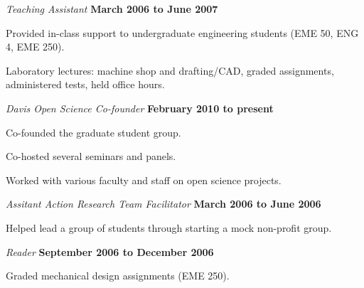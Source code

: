 \documentclass[10pt]{article}
\newenvironment{outerlist}[1][\enskip\textbullet]%
        {\begin{itemize}[#1]}{\end{itemize}%
         \vspace{-.6\baselineskip}}
\newenvironment{innerlist}[1][\enskip\textbullet]%
        {\begin{compactitem}[#1]}{\end{compactitem}}
\newcommand{\blankline}{\quad\pagebreak[2]}
\begin{document}
\begin{outerlist}
\item[] \textit{Teaching Assistant}%
        \hfill \textbf{March 2006 to June 2007}
\begin{innerlist}
  \item Provided in-class support to undergraduate engineering students (EME 50, ENG 4, EME 250).
  \item Laboratory lectures: machine shop and drafting/CAD, graded assignments, administered tests, held office hours.
\end{innerlist}

\item[] \textit{Davis Open Science Co-founder}%
        \hfill \textbf{February 2010 to present}
\begin{innerlist}
  \item Co-founded the graduate student group.
  \item Co-hosted several seminars and panels.
  \item Worked with various faculty and staff on open science projects.
\end{innerlist}

\item[] \textit{Assitant Action Research Team Facilitator}%
        \hfill \textbf{March 2006 to June 2006}
\begin{innerlist}
\item Helped lead a group of students through starting a mock non-profit group.
\end{innerlist}

\item[] \textit{Reader}%
        \hfill \textbf{September 2006 to December 2006}
\begin{innerlist}
\item Graded mechanical design assignments (EME 250).
\end{innerlist}
\end{outerlist}
\blankline
\end{document}

